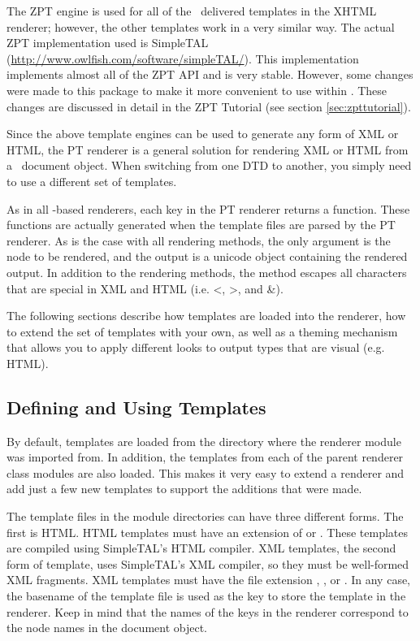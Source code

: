 The ZPT engine is used for all of the \plasTeX\ delivered templates
in the XHTML renderer; however, the other templates work in a very similar way.
The actual ZPT implementation used is SimpleTAL
(\url{http://www.owlfish.com/software/simpleTAL/}).  This implementation
implements almost all of the ZPT API and is very stable.  However, some
changes were made to this package to make it more convenient to use
within \plasTeX.  These changes are discussed in detail in the
ZPT Tutorial (see section \ref{sec:zpttutorial}).

Since the above template engines can be used to generate any form of
XML or HTML, the PT
renderer is a general solution for rendering XML or HTML from a
\plasTeX\ document object.  When switching from one DTD to another,
you simply need to use a different set of templates.

As in all -based renderers, each key in the PT renderer
returns a function.  These functions are actually generated when the
template files are parsed by the PT renderer.
As is the case with all rendering methods, the only argument is the node to be
rendered, and the output is a unicode object containing the rendered
output. In addition to the rendering methods, the  method
escapes all characters that are special in XML and HTML (i.e. <, >, and \&).

The following sections describe how templates are loaded into the
renderer, how to extend the set of templates with your own, as well
as a theming mechanism that allows you to apply different looks to
output types that are visual (e.g. HTML).

\subsection{Defining and Using Templates}


By default, templates are loaded from the directory where the
renderer module was imported from.  In addition, the templates from
each of the parent renderer class modules are also loaded.  This makes
it very easy to extend a renderer and add just a few new templates
to support the additions that were made.

The template files in the module directories can have three different forms.
The first is HTML.  HTML templates must have an extension of  or
 .  These templates are compiled using
SimpleTAL's HTML compiler.  XML templates, the second form of template,
uses SimpleTAL's XML compiler, so they must be well-formed XML
fragments.  XML templates must have the file extension ,
, or .  In any case, the basename of the template
file is used as the key to store the template in the renderer.  Keep in
mind that the names of the keys in the renderer correspond to the node
names in the document object.


